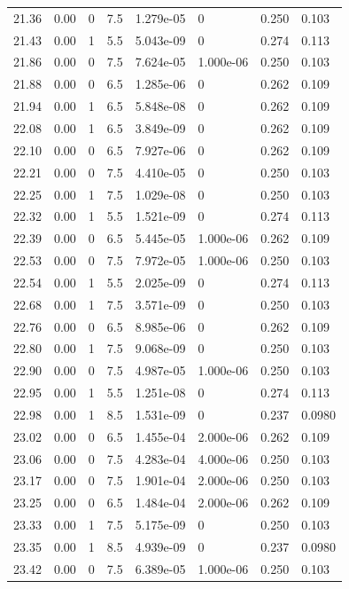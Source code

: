 \documentclass[preview]{standalone}
\begin{document}
{{{{{{{\begin{tabular}{L{1.2cm}C{1.2cm} C{0.3cm}C{0.5cm} C{1.4cm}C{1.4cm} C{1.4cm}C{1.4cm}}
  21.36  &  0.00  & 0     & 7.5 &  1.279e-05  & 0  & 0.250 &  0.103   \\ 
  21.43  &  0.00  & 1     & 5.5 &  5.043e-09  & 0  & 0.274 &  0.113   \\ 
  21.86  &  0.00  & 0     & 7.5 &  7.624e-05  & 1.000e-06  & 0.250 &  0.103   \\ 
  21.88  &  0.00  & 0     & 6.5 &  1.285e-06  & 0  & 0.262 &  0.109   \\ 
  21.94  &  0.00  & 1     & 6.5 &  5.848e-08  & 0  & 0.262 &  0.109   \\ 
  22.08  &  0.00  & 1     & 6.5 &  3.849e-09  & 0  & 0.262 &  0.109   \\ 
  22.10  &  0.00  & 0     & 6.5 &  7.927e-06  & 0  & 0.262 &  0.109   \\ 
  22.21  &  0.00  & 0     & 7.5 &  4.410e-05  & 0  & 0.250 &  0.103   \\ 
  22.25  &  0.00  & 1     & 7.5 &  1.029e-08  & 0  & 0.250 &  0.103   \\ 
  22.32  &  0.00  & 1     & 5.5 &  1.521e-09  & 0  & 0.274 &  0.113   \\ 
  22.39  &  0.00  & 0     & 6.5 &  5.445e-05  & 1.000e-06  & 0.262 &  0.109   \\ 
  22.53  &  0.00  & 0     & 7.5 &  7.972e-05  & 1.000e-06  & 0.250 &  0.103   \\ 
  22.54  &  0.00  & 1     & 5.5 &  2.025e-09  & 0  & 0.274 &  0.113   \\ 
  22.68  &  0.00  & 1     & 7.5 &  3.571e-09  & 0  & 0.250 &  0.103   \\ 
  22.76  &  0.00  & 0     & 6.5 &  8.985e-06  & 0  & 0.262 &  0.109   \\ 
  22.80  &  0.00  & 1     & 7.5 &  9.068e-09  & 0  & 0.250 &  0.103   \\ 
  22.90  &  0.00  & 0     & 7.5 &  4.987e-05  & 1.000e-06  & 0.250 &  0.103   \\ 
  22.95  &  0.00  & 1     & 5.5 &  1.251e-08  & 0  & 0.274 &  0.113   \\ 
  22.98  &  0.00  & 1     & 8.5 &  1.531e-09  & 0  & 0.237 &  0.0980   \\ 
  23.02  &  0.00  & 0     & 6.5 &  1.455e-04  & 2.000e-06  & 0.262 &  0.109   \\ 
  23.06  &  0.00  & 0     & 7.5 &  4.283e-04  & 4.000e-06  & 0.250 &  0.103   \\ 
  23.17  &  0.00  & 0     & 7.5 &  1.901e-04  & 2.000e-06  & 0.250 &  0.103   \\ 
  23.25  &  0.00  & 0     & 6.5 &  1.484e-04  & 2.000e-06  & 0.262 &  0.109   \\ 
  23.33  &  0.00  & 1     & 7.5 &  5.175e-09  & 0  & 0.250 &  0.103   \\ 
  23.35  &  0.00  & 1     & 8.5 &  4.939e-09  & 0  & 0.237 &  0.0980   \\ 
  23.42  &  0.00  & 0     & 7.5 &  6.389e-05  & 1.000e-06  & 0.250 &  0.103   \\ 
\hline 
\end{tabular} 

}}}}}}}
\end{document}
